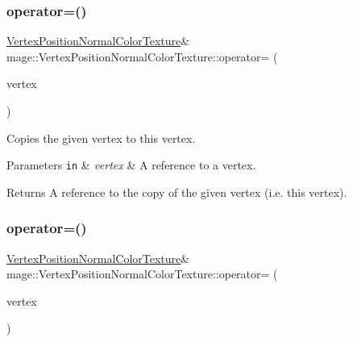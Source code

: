 \subsubsection{\texorpdfstring{operator=()}{operator=()}\hspace{0.1cm}{\footnotesize\ttfamily [1/2]}}
{\footnotesize\ttfamily \hyperlink{structmage_1_1_vertex_position_normal_color_texture}{Vertex\+Position\+Normal\+Color\+Texture}\& mage\+::\+Vertex\+Position\+Normal\+Color\+Texture\+::operator= (\begin{DoxyParamCaption}\item[{const \hyperlink{structmage_1_1_vertex_position_normal_color_texture}{Vertex\+Position\+Normal\+Color\+Texture} \&}]{vertex }\end{DoxyParamCaption})\hspace{0.3cm}{\ttfamily [default]}}

Copies the given vertex to this vertex.


\begin{DoxyParams}[1]{Parameters}
\mbox{\tt in}  & {\em vertex} & A reference to a vertex. \\
\hline
\end{DoxyParams}
\begin{DoxyReturn}{Returns}
A reference to the copy of the given vertex (i.\+e. this vertex). 
\end{DoxyReturn}
\hypertarget{structmage_1_1_vertex_position_normal_color_texture_a98da26b1f52c0b98b44fd3a99080615a}{}\label{structmage_1_1_vertex_position_normal_color_texture_a98da26b1f52c0b98b44fd3a99080615a} 
\subsubsection{\texorpdfstring{operator=()}{operator=()}\hspace{0.1cm}{\footnotesize\ttfamily [2/2]}}
{\footnotesize\ttfamily \hyperlink{structmage_1_1_vertex_position_normal_color_texture}{Vertex\+Position\+Normal\+Color\+Texture}\& mage\+::\+Vertex\+Position\+Normal\+Color\+Texture\+::operator= (\begin{DoxyParamCaption}\item[{\hyperlink{structmage_1_1_vertex_position_normal_color_texture}{Vertex\+Position\+Normal\+Color\+Texture} \&\&}]{vertex }\end{DoxyParamCaption})\hspace{0.3cm}{\ttfamily [default]}}


